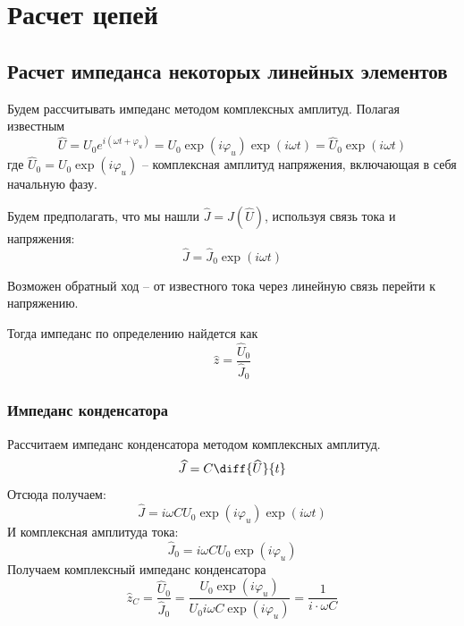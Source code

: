 



\def\labauthors{Понур К.А., Сарафанов Ф.Г., Сидоров Д.А.}
\def\labgroup{420}
\def\labnumber{210}
\def\labtheme{Исследование линейных двухполюсников и четырёхполюсников}
\renewcommand{\vec}{\mathbf}
\renewcommand{\Re}{\operatorname{Re}}
\renewcommand{\Im}{\operatorname{Im}}
\renewcommand{\phi}{\varphi}
\renewcommand{\hat}{\widehat}



\tableofcontents
\newpage

\section{Расчет цепей}
\subsection{Расчет импеданса некоторых линейных элементов}

	Будем рассчитывать импеданс методом комплексных амплитуд.
	Полагая известным
	\begin{equation}
		\hat{U}=
		U_0 e^{i(\omega t+\phi_u)}=
		U_0\exp(i\phi_u)\exp(i\omega t)=
		\hat{U}_0\exp(i\omega t)
	\end{equation}
	где	$\hat{U}_0=U_0\exp(i\phi_u)$ -- комплексная амплитуд напряжения, включающая в себя начальную фазу.
	
	Будем предполагать, что мы нашли $\hat{J}=\hat{J}(\hat{U})$, используя связь тока и напряжения:
	\begin{equation}
		\hat{J}=\hat{J}_0\exp(i\omega t)
	\end{equation}	

	Возможен обратный ход -- от известного тока через линейную связь перейти к напряжению.

	Тогда импеданс по определению найдется как
	\begin{equation}
		\hat{z}=\frac{\hat{U}_0}{\hat{J}_0}
	\end{equation}
\subsubsection{Импеданс конденсатора}
	Рассчитаем импеданс конденсатора методом комплексных амплитуд.
	\begin{equation}
		\hat{J}=C\diff{\hat{U}}{t}
	\end{equation}
	Отсюда получаем:
	\begin{equation}
		\hat{J}=i\omega C U_0\exp(i\phi_u)\exp(i\omega t)
	\end{equation}
	И комплексная амплитуда тока:
	\begin{equation}
		\hat{J}_0=i\omega C U_0\exp(i\phi_u)
	\end{equation}
	Получаем комплексный импеданс конденсатора
	\begin{equation}
		\hat{z}_C=\frac{\hat{U}_0}{\hat{J}_0}=\frac{U_0\exp(i\phi_u)}{U_0i\omega C \exp(i\phi_u)}=\frac{1}{i\cdot\omega C}
	\end{equation}

